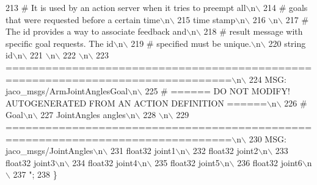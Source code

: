 \begin{DoxyCode}
213 \textcolor{stringliteral}{# It is used by an action server when it tries to preempt all\(\backslash\)n\(\backslash\)}
214 \textcolor{stringliteral}{# goals that were requested before a certain time\(\backslash\)n\(\backslash\)}
215 \textcolor{stringliteral}{time stamp\(\backslash\)n\(\backslash\)}
216 \textcolor{stringliteral}{\(\backslash\)n\(\backslash\)}
217 \textcolor{stringliteral}{# The id provides a way to associate feedback and\(\backslash\)n\(\backslash\)}
218 \textcolor{stringliteral}{# result message with specific goal requests. The id\(\backslash\)n\(\backslash\)}
219 \textcolor{stringliteral}{# specified must be unique.\(\backslash\)n\(\backslash\)}
220 \textcolor{stringliteral}{string id\(\backslash\)n\(\backslash\)}
221 \textcolor{stringliteral}{\(\backslash\)n\(\backslash\)}
222 \textcolor{stringliteral}{\(\backslash\)n\(\backslash\)}
223 \textcolor{stringliteral}{================================================================================\(\backslash\)n\(\backslash\)}
224 \textcolor{stringliteral}{MSG: jaco\_msgs/ArmJointAnglesGoal\(\backslash\)n\(\backslash\)}
225 \textcolor{stringliteral}{# ====== DO NOT MODIFY! AUTOGENERATED FROM AN ACTION DEFINITION ======\(\backslash\)n\(\backslash\)}
226 \textcolor{stringliteral}{# Goal\(\backslash\)n\(\backslash\)}
227 \textcolor{stringliteral}{JointAngles angles\(\backslash\)n\(\backslash\)}
228 \textcolor{stringliteral}{\(\backslash\)n\(\backslash\)}
229 \textcolor{stringliteral}{================================================================================\(\backslash\)n\(\backslash\)}
230 \textcolor{stringliteral}{MSG: jaco\_msgs/JointAngles\(\backslash\)n\(\backslash\)}
231 \textcolor{stringliteral}{float32 joint1\(\backslash\)n\(\backslash\)}
232 \textcolor{stringliteral}{float32 joint2\(\backslash\)n\(\backslash\)}
233 \textcolor{stringliteral}{float32 joint3\(\backslash\)n\(\backslash\)}
234 \textcolor{stringliteral}{float32 joint4\(\backslash\)n\(\backslash\)}
235 \textcolor{stringliteral}{float32 joint5\(\backslash\)n\(\backslash\)}
236 \textcolor{stringliteral}{float32 joint6\(\backslash\)n\(\backslash\)}
237 \textcolor{stringliteral}{"};
238   \}
\end{DoxyCode}
